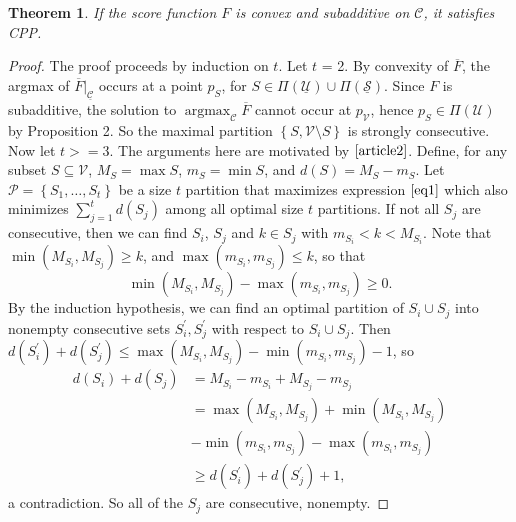 \documentclass{article}
\newtheorem{thm}{Theorem}
\theoremstyle{case}
\DeclareMathOperator*{\argmax}{argmax} %
\begin{document}
\begin{thm} \label{thm1}
If the score function $F$ is convex and subadditive on $\mathcal{C}$, it satisfies CPP.
\end{thm}

\begin{proof}
The proof proceeds by induction on $t$. Let $t$ = 2. By convexity of $\overline{F}$, the argmax of $\overline{F} |_{\underline{\mathcal{C}}}$ occurs at a point $p_S$, for $S \in \Pi\left( \underline{\mathcal{U}}\right) \cup \Pi\left( \underline{\mathcal{S}}\right)$. Since $F$ is subadditive, the solution to $\argmax_{\mathcal{C}}{\overline{F}}$ cannot occur at $p_{\mathcal{V}}$, hence $p_S \in \Pi\left( \mathcal{U}\right)$ by Proposition 2. So the maximal partition $\left\lbrace S, \mathcal{V} \setminus S\right\rbrace$ is strongly consecutive. Now let $t >= 3$. The arguments here are motivated by $\cite{article2}$. Define, for any subset $S \subseteq \mathcal{V}$, $M_S = \max S$, $m_S = \min S$, and $d\left(S\right) = M_S - m_S$. Let $\mathcal{P} = \left\lbrace S_1, \dots, S_t\right\rbrace$ be a size $t$ partition that maximizes expression $\ref{eq1}$ which also minimizes $\sum_{j=1}^t d\left(S_j\right)$ among all optimal size $t$ partitions. If not all $S_j$ are consecutive, then we can find $S_i$, $S_j$ and $k \in S_j$ with $m_{S_i} < k < M_{S_i}$. Note that $\min\left( M_{S_i}, M_{S_j}\right) \geq k$,  and $\max\left( m_{S_i}, m_{S_j} \right) \leq k$, so that 
\[
\min\left( M_{S_i}, M_{S_j}\right) - \max\left( m_{S_i}, m_{S_j} \right) \geq 0.
\] 
By the induction hypothesis, we can find an optimal partition of $S_i \cup S_j$ into nonempty consecutive sets $S^{\prime}_i, S^{\prime}_j$ with respect to $S_i \cup S_j$. Then $d\left( S^{\prime}_i\right) + d\left( S^{\prime}_j\right) \leq \max\left( M_{S_i}, M_{S_j}\right) - \min\left( m_{S_i}, m_{S_j}\right) - 1$, so
\begin{align*}
d\left(S_i\right) + d\left( S_j\right) &= M_{S_i} - m_{S_i} + M_{S_j} - m_{S_j} \\
&= \max\left(M_{S_i}, M_{S_j}\right) + \min\left(M_{S_i}, M_{S_j}\right) \\
&- \min\left( m_{S_i}, m_{S_j} \right) - \max\left( m_{S_i}, m_{S_j} \right) \\
&\geq d\left(S^{\prime}_i\right) + d\left(S^{\prime}_j\right) + 1,
\end{align*}
a contradiction. So all of the $S_j$ are consecutive, nonempty.
\end{proof}
\end{document}

